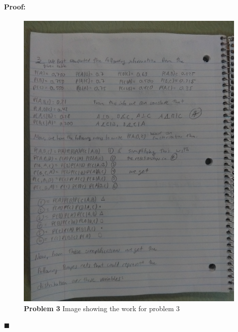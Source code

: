 \documentclass[12pt]{article}
\newenvironment{proof}{\paragraph{Proof: }}{\hfill$\blacksquare$}
\begin{document}
\begin{proof}

\begin{figure}[!htbp]
\centering
\includegraphics[width = 13cm]{prob3_hw5.jpg}
\caption{\textbf{Problem 3} Image showing the work for problem 3}
\end{figure}


\end{proof}
\end{document}
